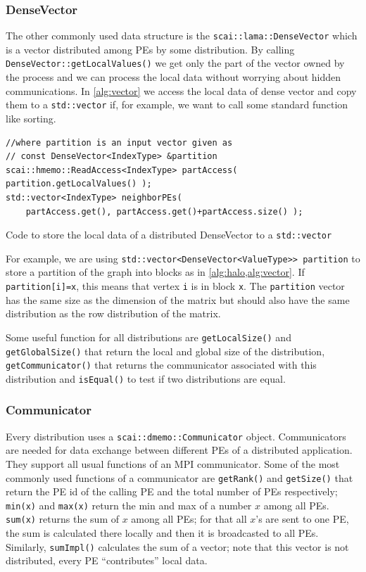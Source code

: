 \documentclass[a4paper,10pt]{article}
\newcommand{\quot}[1]{``#1''}
\newcommand{\MI}[1]{\texttt{#1}}
\begin{document}
\subsubsection*{DenseVector}

The other commonly used data structure is the \MI{scai::lama::DenseVector} which is a vector distributed
among PEs by some distribution. By calling \MI{DenseVector::getLocalValues()} we get only the part
of the vector owned by the process and we can process the local data without worrying about hidden
communications. In \cref{alg:vector} we access the local data of dense vector and copy them to 
a \MI{std::vector} if, for example, we want to call some standard function like sorting.

\begin{algorithm}
\begin{verbatim}
//where partition is an input vector given as
// const DenseVector<IndexType> &partition
scai::hmemo::ReadAccess<IndexType> partAccess( partition.getLocalValues() );
std::vector<IndexType> neighborPEs( 
	partAccess.get(), partAccess.get()+partAccess.size() );
\end{verbatim}
\caption{Code to store the local data of a distributed DenseVector to a \MI{std::vector}}
\label{alg:vector}
\end{algorithm}

For example, we are using \MI{std::vector<DenseVector<ValueType>> partition} to store a partition of the graph
into blocks as in \cref{alg:halo,alg:vector}. If \MI{partition[i]=x}, this means that vertex \MI{i}
is in block \MI{x}.
The \MI{partition} vector has the same size as the 
dimension of the matrix but should also have the same distribution as the row distribution of the matrix.


Some useful function for all distributions are \MI{getLocalSize()} and \MI{getGlobalSize()} that return
the local and global size of the distribution, \MI{getCommunicator()} that returns the communicator associated
with this distribution and \MI{isEqual()} to test if two distributions are equal.


\subsubsection*{Communicator}

Every distribution uses a \MI{scai::dmemo::Communicator} object. Communicators are needed for 
data exchange between different PEs of a distributed application. They support all usual functions
of an MPI communicator. Some of the most commonly used functions 
of a communicator are \MI{getRank()} and \MI{getSize()} that return the PE id of the calling PE and the
total number of PEs respectively; \MI{min(x)} and \MI{max(x)} return the min and max of a
number $x$ among all PEs. \MI{sum(x)} returns the sum of $x$ among all PEs; for that all $x$'s are sent to one PE, the
sum is calculated there locally and then it is broadcasted to all PEs. Similarly, \MI{sumImpl()}
calculates the sum of a vector; note that this vector is not distributed, every PE \quot{contributes}
local data.
\end{document}
